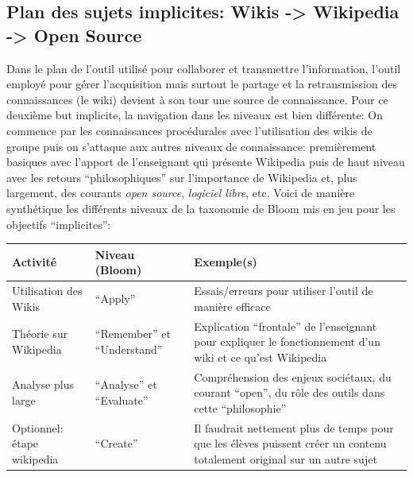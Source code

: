 \documentclass[11pt,bibliography=totoc]{scrartcl}
\newcommand\ajout[1]{{\color{blue} #1}}
\newcommand\rajout[1]{{\color{green} #1}}
\begin{document}
\subsection{Plan des sujets implicites: Wikis -> Wikipedia -> Open Source}
Dans le plan de l'outil utilisé pour collaborer et transmettre l'information,
l'outil employé pour gérer l'acquisition mais surtout le partage et la
retransmission des connaissances (le wiki) devient à son tour une source de
connaissance.  Pour ce deuxième but implicite, la navigation dans les niveaux
est bien différente: On commence par les connaissances procédurales avec
l'utilisation des wikis de groupe puis on s'attaque aux autres niveaux de
connaissance: premièrement basiques avec l'apport de l'enseignant qui présente
Wikipedia puis de haut niveau avec les retours ``philosophiques'' sur
l'importance de Wikipedia et, plus largement, des courants \textit{open source},
\textit{logiciel libre}, etc.  \ajout{Voici de manière synthétique les
  différents niveaux de la taxonomie de Bloom mis en jeu pour les objectifs
  ``implicites'':}
\rajout{
\begin{center}
   \begin{tabular}{@{}m{}m{.2\textwidth}m{.45\textwidth}@{}}
     \toprule
     Activité & Niveau (Bloom) & Exemple(s) \\ 
     \midrule
     Utilisation des Wikis & ``Apply'' & Essais/erreurs pour utiliser l'outil de manière efficace \\ 
     Théorie sur Wikipedia & ``Remember'' et ``Understand'' & Explication
                                                              ``frontale'' de
                                                              l'enseignant pour
                                                              expliquer le
                                                              fonctionnement
                                                              d'un wiki et ce
                                                              qu'est Wikipedia \\
     Analyse plus large & ``Analyse'' et ``Evaluate'' & Compréhension des enjeux
                                                        sociétaux, du courant
                                                        ``open'', du rôle des outils dans cette ``philosophie'' \\

     Optionnel: étape wikipedia & ``Create'' & Il faudrait nettement plus de
                                                 temps pour que les élèves
                                                 puissent créer un contenu
                                                 totalement original sur un
                                                 autre sujet\\
     \bottomrule
   \end{tabular}
 \end{center}
}
\end{document}
